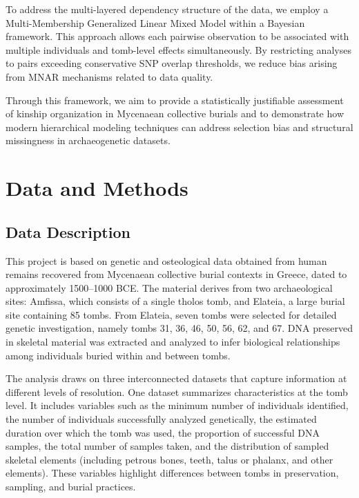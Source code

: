 \documentclass[
]{ajs}
\begin{document}
To address the multi-layered dependency structure of the data, we employ
a Multi-Membership Generalized Linear Mixed Model within a Bayesian
framework. This approach allows each pairwise observation to be
associated with multiple individuals and tomb-level effects
simultaneously. By restricting analyses to pairs exceeding conservative
SNP overlap thresholds, we reduce bias arising from MNAR mechanisms
related to data quality.

Through this framework, we aim to provide a statistically justifiable
assessment of kinship organization in Mycenaean collective burials and
to demonstrate how modern hierarchical modeling techniques can address
selection bias and structural missingness in archaeogenetic datasets.

\section{Data and Methods}\label{data-and-methods}

\subsection{Data Description}\label{data-description}

This project is based on genetic and osteological data obtained from
human remains recovered from Mycenaean collective burial contexts in
Greece, dated to approximately 1500--1000 BCE. The material derives from
two archaeological sites: Amfissa, which consists of a single tholos
tomb, and Elateia, a large burial site containing 85 tombs. From
Elateia, seven tombs were selected for detailed genetic investigation,
namely tombs 31, 36, 46, 50, 56, 62, and 67. DNA preserved in skeletal
material was extracted and analyzed to infer biological relationships
among individuals buried within and between tombs.

The analysis draws on three interconnected datasets that capture
information at different levels of resolution. One dataset summarizes
characteristics at the tomb level. It includes variables such as the
minimum number of individuals identified, the number of individuals
successfully analyzed genetically, the estimated duration over which the
tomb was used, the proportion of successful DNA samples, the total
number of samples taken, and the distribution of sampled skeletal
elements (including petrous bones, teeth, talus or phalanx, and other
elements). These variables highlight differences between tombs in
preservation, sampling, and burial practices.
\end{document}
